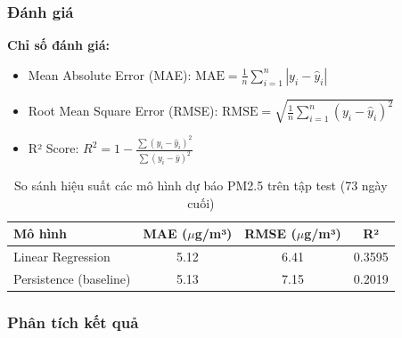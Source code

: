 \documentclass[12pt,a4paper]{article}
\begin{document}
\subsubsection{Đánh giá}

\textbf{Chỉ số đánh giá:}
\begin{itemize}
    \item Mean Absolute Error (MAE): $\text{MAE} = \frac{1}{n}\sum_{i=1}^{n}|y_i - \hat{y}_i|$
    \item Root Mean Square Error (RMSE): $\text{RMSE} = \sqrt{\frac{1}{n}\sum_{i=1}^{n}(y_i - \hat{y}_i)^2}$
    \item R² Score: $R^2 = 1 - \frac{\sum(y_i - \hat{y}_i)^2}{\sum(y_i - \bar{y})^2}$
\end{itemize}

\begin{table}[H]
\centering
\begin{tabular}{lccc}
\toprule
\textbf{Mô hình} & \textbf{MAE ($\mu$g/m³)} & \textbf{RMSE ($\mu$g/m³)} & \textbf{R²} \\
\midrule
Linear Regression & 5.12 & 6.41 & 0.3595 \\
Persistence (baseline) & 5.13 & 7.15 & 0.2019 \\
\bottomrule
\end{tabular}
\caption{So sánh hiệu suất các mô hình dự báo PM2.5 trên tập test (73 ngày cuối)}
\label{tab:forecast_results}
\end{table}

\subsubsection{Phân tích kết quả}
\end{document}
